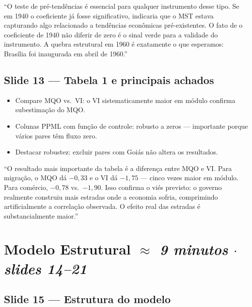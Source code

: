 \documentclass[12pt, a4paper]{article}
\begin{document}
\begin{mdframed}[style=sintese]
``O teste de pré-tendências é essencial para qualquer instrumento desse tipo. Se em 1940 o coeficiente
já fosse significativo, indicaria que o MST estava capturando algo relacionado a tendências econômicas
pré-existentes. O fato de o coeficiente de 1940 não diferir de zero é o sinal verde para a validade do instrumento.
A quebra estrutural em 1960 é exatamente o que esperamos: Brasília foi inaugurada em abril de 1960.''
\end{mdframed}

\subsection*{Slide 13 --- Tabela 1 e principais achados}

\begin{itemize}
    \item Compare MQO vs.\ VI: o VI sistematicamente maior em módulo confirma subestimação do MQO.
    \item Colunas PPML com função de controle: robusto a zeros --- importante porque vários pares têm fluxo zero.
    \item Destacar robustez: excluir pares com Goiás não altera os resultados.
\end{itemize}

\begin{mdframed}[style=sintese]
``O resultado mais importante da tabela é a diferença entre MQO e VI. Para migração, o MQO dá $-0{,}33$
e o VI dá $-1{,}75$ --- cinco vezes maior em módulo. Para comércio, $-0{,}78$ vs.\ $-1{,}90$.
Isso confirma o viés previsto: o governo realmente construiu mais estradas onde a economia sofria,
comprimindo artificialmente a correlação observada. O efeito real das estradas é substancialmente maior.''
\end{mdframed}

\vspace{0.3cm}

\section{Modelo Estrutural \hfill \normalfont\small\textit{$\approx$ 9 minutos $\cdot$ slides 14--21}}

\subsection*{Slide 15 --- Estrutura do modelo}
\end{document}
